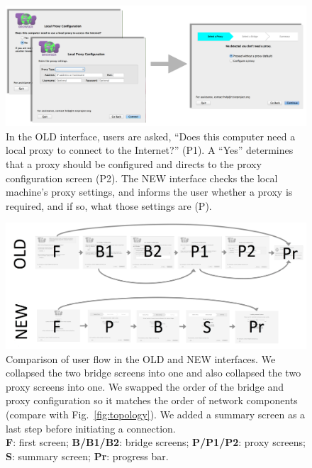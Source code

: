 \documentclass[USenglish,oneside,twocolumn]{article}
\begin{document}
\begin{figure}[t]
	\centering
		\includegraphics[width=.8\textwidth]{proxy-screens.pdf} 
		\caption{In the OLD interface, users are asked, ``Does this computer need a local proxy to connect
		to the Internet?'' (P1). A ``Yes'' determines that a proxy should be configured and directs to the 
		proxy configuration screen (P2). The NEW interface checks the local machine's proxy settings,
		and informs the user whether a proxy is required, and if so, what those settings are (P).}
\end{figure}

\begin{figure}[t]
\centering
\includegraphics[width=.85\textwidth]{old-and-new-flows.png}
\caption{
Comparison of user flow in the OLD and NEW interfaces.
We collapsed the two bridge screens into one 
and also collapsed the two proxy screens into one.
We swapped the order of the bridge and proxy configuration
so it matches the order of network components (compare with Fig.~\ref{fig:topology}).
We added a summary screen as a last step before initiating a connection.\\
\textbf{F}: first screen;
\textbf{B/B1/B2}: bridge screens;
\textbf{P/P1/P2}: proxy screens;
\textbf{S}: summary screen;
\textbf{Pr}: progress bar.
}
\label{fig:flow}
\end{figure} 
\end{document}
